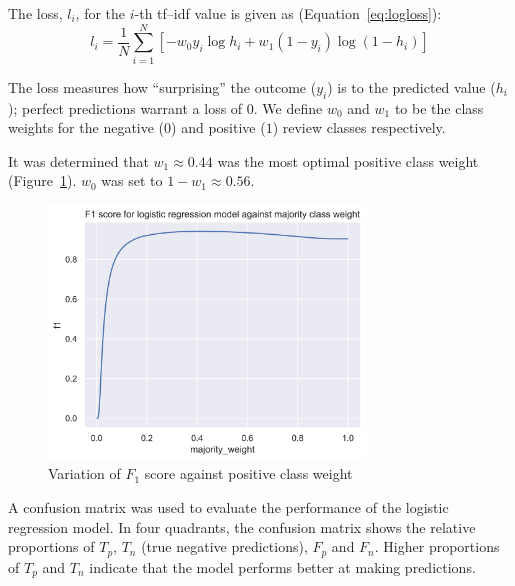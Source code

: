 \documentclass[11pt, a4paper]{pancake-article}
\begin{document}
The loss, \(l_i\), for the \(i\)-th tf--idf value is given as (Equation~\ref{eq:logloss}):
\begin{equation}
	l_i = \frac{1}{N} \sum^{N}_{i = 1}\left[-w_0 y_i \log h_i + w_1\left(1 - y_i\right) \log \left(1 - h_i\right)\right]
	\label{eq:logloss}
\end{equation}

The loss measures how ``surprising'' the outcome ($y_i$) is to the predicted
value ($h_i$); perfect predictions warrant a loss of $0$. We define $w_0$ and $w_1$
to be the class weights for the negative ($0$) and positive ($1$) review classes
respectively.

It was determined that $w_1 \approx 0.44$ was the most optimal positive class weight (Figure~\ref{fig:f1-variation}).
$w_0$ was set to $1 - w_1 \approx 0.56$.

\begin{figure}
	\begin{center}
		\includegraphics[width=0.75\textwidth]{../results/logistic_f1.png}
	\end{center}
	\caption{Variation of $F_1$ score against positive class weight}\label{fig:f1-variation}
\end{figure}

A confusion matrix was used to evaluate the performance of the logistic regression model. In
four quadrants, the confusion matrix shows the relative proportions of $T_p$, $T_n$ (true negative
predictions), $F_p$ and $F_n$. Higher proportions of $T_p$ and $T_n$ indicate that the model performs
better at making predictions.
\end{document}
